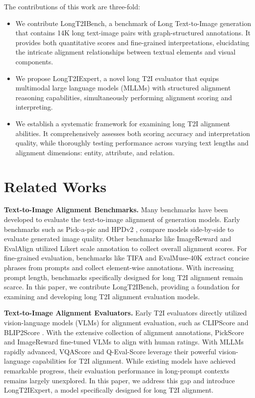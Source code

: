\documentclass[letterpaper]{article} %
\begin{document}
The contributions of this work are three-fold:

\begin{itemize}
	\item We contribute LongT2IBench, a benchmark of Long Text-to-Image generation that contains 14K long text-image pairs with graph-structured annotations. It provides both quantitative scores and fine-grained interpretations, elucidating the intricate alignment relationships between textual elements and visual components.
	\item We propose LongT2IExpert, a novel long T2I evaluator that equips multimodal large language models (MLLMs) with structured alignment reasoning capabilities, simultaneously performing alignment scoring and interpreting.
	\item We establish a systematic framework for examining long T2I alignment abilities. It comprehensively assesses both scoring accuracy and interpretation quality, while thoroughly testing performance across varying text lengths and alignment dimensions: entity, attribute, and relation.
\end{itemize}



\section{Related Works}

\textbf{Text-to-Image Alignment Benchmarks.} Many benchmarks have been developed to evaluate the text-to-image alignment of generation models. Early benchmarks such as Pick-a-pic \cite{kirstain2023pick} and HPDv2 \cite{wu2023human}, compare models side-by-side to evaluate generated image quality. Other benchmarks like ImageReward \cite{xu2023imagereward} and EvalAlign \cite{tan2024evalalign} utilized Likert scale annotation to collect overall alignment scores. For fine-grained evaluation, benchmarks like TIFA \cite{hu2023tifa} and EvalMuse-40K \cite{han2024evalmuse} extract concise phrases from prompts and collect element-wise annotations. With increasing prompt length, benchmarks specifically designed for long T2I alignment remain scarce. In this paper, we contribute LongT2IBench, providing a foundation for examining and developing long T2I alignment evaluation models.

\textbf{Text-to-Image Alignment Evaluators.} Early T2I evaluators directly utilized vision-language models (VLMs) for alignment evaluation, such as CLIPScore \cite{hessel2021clipscore} and BLIP2Score \cite{li2023blip}. With the extensive collection of alignment annotations, PickScore \cite{kirstain2023pick} and ImageReward \cite{xu2023imagereward} fine-tuned VLMs to align with human ratings. With MLLMs rapidly advanced, VQAScore \cite{li2024evaluating} and Q-Eval-Score \cite{zhang2025q} leverage their powerful vision-language capabilities for T2I alignment. While existing models have achieved remarkable progress, their evaluation performance in long-prompt contexts remains largely unexplored. In this paper, we address this gap and introduce LongT2IExpert, a model specifically designed for long T2I alignment.
\end{document}
